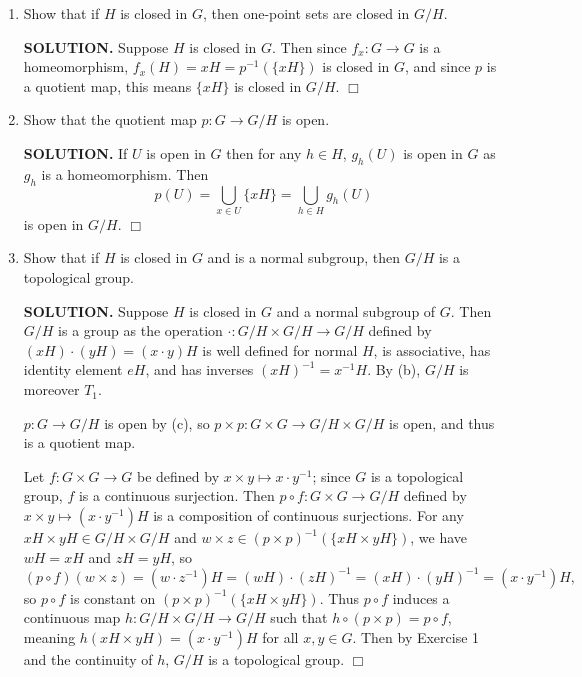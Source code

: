 \documentclass{article}
\begin{document}
\begin{enumerate}
\begin{enumerate}
        \item Show that if $H$ is closed in $G$, then one-point sets are closed in $G / H$.

        {\bf SOLUTION.} Suppose $H$ is closed in $G$. Then since $f_x: G \rightarrow G$ is a homeomorphism, $f_x(H) = xH = p^{-1}(\{xH\})$ is closed in $G$, and since $p$ is a quotient map, this means $\{xH\}$ is closed in $G / H$. $\Box$

        \item Show that the quotient map $p: G \rightarrow G / H$ is open.

        {\bf SOLUTION.} If $U$ is open in $G$ then for any $h \in H$, $g_h(U)$ is open in $G$ as $g_h$ is a homeomorphism. Then
        $$p(U) = \bigcup_{x \in U} \{xH\} = \bigcup_{h \in H} g_h(U)$$
        is open in $G / H$. $\Box$
        
        \item Show that if $H$ is closed in $G$ and is a normal subgroup, then $G / H$ is a topological group.

        {\bf SOLUTION.} Suppose $H$ is closed in $G$ and a normal subgroup of $G$. Then $G / H$ is a group as the operation $\cdot: G / H \times G / H \rightarrow G / H$ defined by $(xH) \cdot (yH) = (x \cdot y)H$ is well defined for normal $H$, is associative, has identity element $eH$, and has inverses $(xH)^{-1} = x^{-1}H$. By (b), $G / H$ is moreover $T_1$.
        
        $p: G \rightarrow G / H$ is open by (c), so $p \times p: G \times G \rightarrow G/H \times G/H$ is open, and thus is a quotient map.
        
        Let $f: G \times G \rightarrow G$ be defined by $x \times y \mapsto x \cdot y^{-1}$; since $G$ is a topological group, $f$ is a continuous surjection. Then $p \circ f: G \times G \rightarrow G / H$ defined by $x \times y \mapsto (x \cdot y^{-1})H$ is a composition of continuous surjections. For any $xH \times yH \in G/H \times G/H$ and $w \times z \in (p \times p)^{-1}(\{xH \times yH\})$, we have $wH = xH$ and $zH = yH$, so
        $$(p \circ f)(w \times z) = (w \cdot z^{-1})H = (wH) \cdot (zH)^{-1} = (xH) \cdot (yH)^{-1} = (x \cdot y^{-1})H,$$
        so $p \circ f$ is constant on $(p \times p)^{-1}(\{xH \times yH\})$. Thus $p \circ f$ induces a continuous map $h: G / H \times G / H \rightarrow G / H$ such that $h \circ (p \times p) = p \circ f$, meaning $h(xH \times yH) = (x \cdot y^{-1})H$ for all $x, y \in G$. Then by Exercise 1 and the continuity of $h$, $G / H$ is a topological group. $\Box$
    \end{enumerate}


\end{enumerate}
\end{document}
